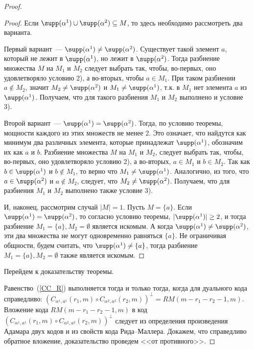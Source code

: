 \begin{proof}
\begin{proof}
		Если $\supp(\alpha^1) \cup \supp(\alpha^2) \subseteq M$, то здесь необходимо рассмотреть два варианта.

		Первый вариант~--- $\supp(\alpha^1) \neq \supp(\alpha^2)$.
		Существует такой элемент $a$, который не лежит в \(\supp(\alpha^1)\), но лежит в \(\supp(\alpha^2)\).
		Тогда разбиение множества $M$ на $M_1$ и $M_2$ следует выбрать так, чтобы, во-первых, оно удовлетворяло условию 2), а во-вторых, чтобы $a \in M_1$.
		При таком разбиении $a\not\in M_2$, значит $M_2 \neq \supp(\alpha^2)$ и $M_1 \neq \supp(\alpha^1)$, т.к.
		в \(M_1\) нет элемента \(a\) из \(\supp(\alpha^1)\).
		Получаем, что для такого разбиения $M_1$ и $M_2$ выполнено и условие 3).

		Второй вариант~--- $\supp(\alpha^1) = \supp(\alpha^2)$.
		Тогда, по условию теоремы, мощности каждого из этих множеств не менее 2.
		Это означает, что найдутся как минимум два различных элемента, которые принадлежат $\supp(\alpha^1)$, обозначим их как $a$ и $b$.
		Разбиение множества $M$ на $M_1$ и $M_2$, следует выбрать так, чтобы, во-первых, оно удовлетворяло условию 2), а во-вторых, $a \in M_1$ и $b \in M_2$.
		Так как $b \in \supp(\alpha^1)$ и $b \not\in M_1$, то верно что $M_1 \neq \supp(\alpha^1)$.
		Аналогично, из того, что $a \in \supp(\alpha^2)$ и $a \not\in M_2$, следует, что $M_2 \neq \supp(\alpha^2)$.
		Получаем, что для разбиения $M_1$ и $M_2$ выполнено также условие 3).

		И, наконец, рассмотрим случай $|M| = 1$.
		Пусть $M=\{a\}$.
		Если $\supp(\alpha^1) = \supp(\alpha^2)$, то согласно условию теоремы, $|\supp(\alpha^1)| \ge 2$, и тогда разбиение $M_1 = \{a\}, M_2 = \emptyset$ является искомым.
		А когда $\supp(\alpha^1) \neq \supp(\alpha^2)$, эти два множества не могут одновременно равняться $\{a\}$.
		Не ограничивая общности, будем считать, что $\supp(\alpha^1) \neq \{a\}$, тогда разбиение  $M_1 = \{a\}, M_2 = \emptyset$ также является искомым.
	\end{proof}

	Перейдем к доказательству теоремы.

	Равенство~(\ref{CC_R}) выполняется тогда и только тогда, когда для дуального кода справедливо:
	$\left( C_{\alpha^1,a^1}(r_1,m)\circ C_{\alpha^2,a^2}(r_2,m)\right)^{\perp}=RM(m-r_1-r_2-1,m).$
	Вложение кода $RM(m-r_1-r_2-1,m)$ в код $( C_{\alpha^1,a^1}(r_1,m)\circ C_{\alpha^2,a^2}(r_2,m))^{\perp}$ следует из определения произведения Адамара двух кодов и из свойств кода Рида--Маллера.
	Докажем, что справедливо обратное вложение, доказательство проведем <<от противного>>.


\end{proof}
